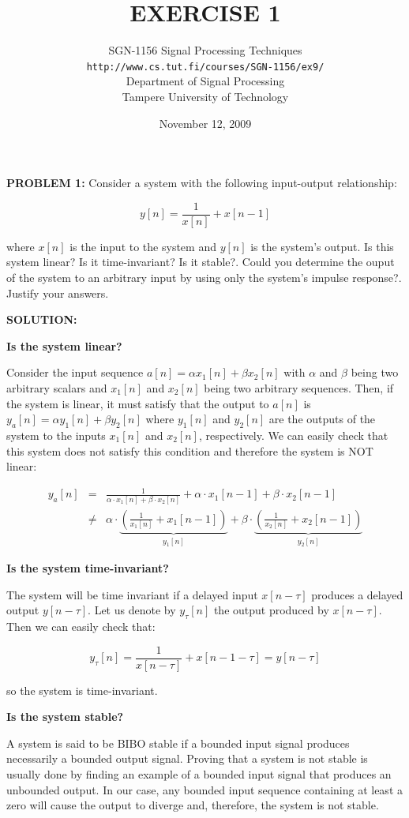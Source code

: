 \documentclass[11pt]{article}
\title{\large{\textbf{EXERCISE 1}}}
\author{SGN-1156 Signal Processing Techniques\\
\texttt{http://www.cs.tut.fi/courses/SGN-1156/ex9/}\\
Department of Signal Processing\\
Tampere University of Technology}
\date{November 12, 2009}
\begin{document}
\maketitle


\textbf{PROBLEM 1:}  Consider a system with the following input-output relationship:

\[
y[n] = \frac{1}{x[n]}+x[n-1]
\]

where $x[n]$ is the input to the system and $y[n]$ is the system's output. Is this system linear? Is it time-invariant? Is it stable?. Could you determine the ouput of the system to an arbitrary input by using only the system's impulse response?. Justify your answers. 

\vspace{1cm}

\textbf{SOLUTION:}

\textbf{Is the system linear?}

Consider the input sequence $a[n]=\alpha x_1[n]+\beta x_2[n]$ with $\alpha$ and $\beta$ being two arbitrary scalars and $x_1[n]$ and $x_2[n]$ being two arbitrary sequences. Then, if the system is linear, it must satisfy that the output to $a[n]$ is $y_a[n]=\alpha y_1[n] + \beta y_2[n]$ where $y_1[n]$ and $y_2[n]$ are the outputs of the system to the inputs $x_1[n]$ and $x_2[n]$, respectively. We can easily check that this system does not satisfy this condition and therefore the system is NOT linear:

\[
\begin{array}{lll}
y_a[n]&=&\frac{1}{\alpha\cdot x_1[n]+\beta\cdot x_2[n]}+\alpha\cdot x_1[n-1]+\beta\cdot x_2[n-1]\\ &\neq&\alpha\cdot\underbrace{\left(\frac{1}{x_1[n]}+x_1[n-1]\right)}_{y_1[n]}+\beta\cdot\underbrace{\left(\frac{1}{x_2[n]}+x_2[n-1]\right)}_{y_2[n]}
\end{array}
\]

\textbf{Is the system time-invariant?}

The system will be time invariant if a delayed input $x[n-\tau]$ produces a delayed output $y[n-\tau]$. Let us denote by $y_\tau[n]$ the output produced by $x[n-\tau]$. Then we can easily check that:

\[
y_\tau[n] = \frac{1}{x[n-\tau]}+x[n-1-\tau] =y[n-\tau]
\]

so the system is time-invariant.


\textbf{Is the system stable?}

A system is said to be BIBO stable if a bounded input signal produces necessarily a bounded output signal. Proving that a system is not stable is usually done by finding an example of a bounded input signal that produces an unbounded output. In our case, any bounded input sequence containing at least a zero will cause the output to diverge and, therefore, the system is not stable.
\end{document}
